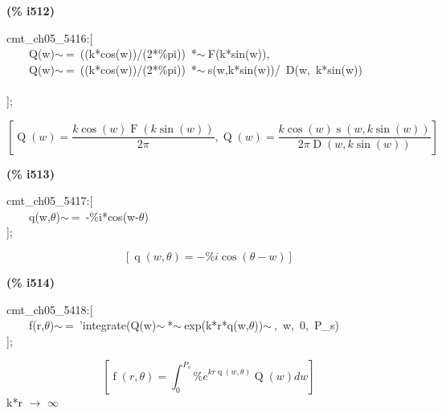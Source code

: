\documentclass[fleqn]{article}
\begin{document}
\noindent
\begin{minipage}[t]{4.000000em}\color{red}\bfseries
(\% i512)	
\end{minipage}
\begin{minipage}[t]{\textwidth}\color{blue}
cmt\_ch05\_5416:[\\
\ \ \ \ Q(w)\ensuremath{\sim\ }=\ ((k*cos(w))/(2*\%pi))\ *\ensuremath{\sim\ }F(k*sin(w)),\\
\ \ \ \ Q(w)\ensuremath{\sim\ }=\ ((k*cos(w))/(2*\%pi))\ *\ensuremath{\sim\ }s(w,k*sin(w))/\ D(w,\ k*sin(w))\\
\\
];
\end{minipage}
\[\displaystyle \tag{\% o512} 
\left[ \operatorname{Q}(w)=\frac{k \cos{(w)} \operatorname{F}\left( k \sin{(w)}\right) }{2 \ensuremath{\pi} }\operatorname{,}\operatorname{Q}(w)=\frac{k \cos{(w)} \operatorname{s}\left( w\operatorname{,}k \sin{(w)}\right) }{2 \ensuremath{\pi}  \operatorname{D}\left( w\operatorname{,}k \sin{(w)}\right) }\right] \mbox{}
\]


\noindent
\begin{minipage}[t]{4.000000em}\color{red}\bfseries
(\% i513)	
\end{minipage}
\begin{minipage}[t]{\textwidth}\color{blue}
cmt\_ch05\_5417:[\\
\ \ \ \ q(w,\ensuremath{\theta})\ensuremath{\sim\ }=\ -\%i*cos(w-\ensuremath{\theta})\\
];
\end{minipage}
\[\displaystyle \tag{\% o513} 
\left[ \operatorname{q}\left( w\operatorname{,}\theta \right) =-\% i \cos{\left( \theta -w\right) }\right] \mbox{}
\]


\noindent
\begin{minipage}[t]{4.000000em}\color{red}\bfseries
(\% i514)	
\end{minipage}
\begin{minipage}[t]{\textwidth}\color{blue}
cmt\_ch05\_5418:[\\
\ \ \ \ f(r,\ensuremath{\theta})\ensuremath{\sim\ }=\ 'integrate(Q(w)\ensuremath{\sim\ }*\ensuremath{\sim\ }exp(k*r*q(w,\ensuremath{\theta}))\ensuremath{\sim\ },\ w,\ 0,\ P\_s)\\
];
\end{minipage}
\[\displaystyle \tag{\% o514} 
\left[ \operatorname{f}\left( r\operatorname{,}\theta \right) =\int_{0}^{{P_s}}{\left. {{\% e}^{k r \operatorname{q}\left( w\operatorname{,}\theta \right) }} \operatorname{Q}(w)dw\right.}\right] \mbox{}
\]
k*r \ensuremath{\longrightarrow} \ensuremath{\infty}
\end{document}
